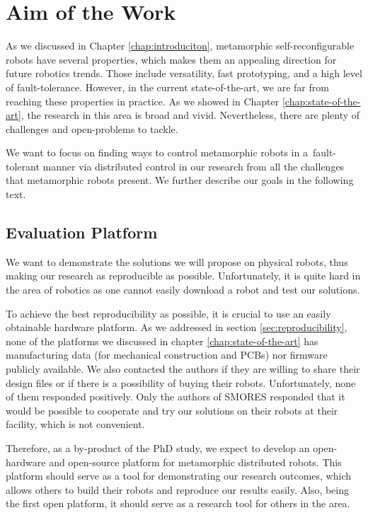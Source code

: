 \chapter{Aim of the Work}

As we discussed in Chapter \ref{chap:introduciton}, metamorphic
self-reconfigurable robots have several properties, which makes them an
appealing direction for future robotics trends. Those include versatility, fast
prototyping, and a high level of fault-tolerance. However, in the current
state-of-the-art, we are far from reaching these properties in practice. As we
showed in Chapter \ref{chap:state-of-the-art}, the research in this area is
broad and vivid. Nevertheless, there are plenty of challenges and open-problems
to tackle.

We want to focus on finding ways to control metamorphic robots in
a~fault-tolerant manner via distributed control in our research from all the
challenges that metamorphic robots present. We further describe our goals in the
following text.

\section{Evaluation Platform}

We want to demonstrate the solutions we will propose on physical robots, thus
making our research as reproducible as possible. Unfortunately, it is quite hard
in the area of robotics as one cannot easily download a robot and test our
solutions.

To achieve the best reproducibility as possible, it is crucial to use an easily
obtainable hardware platform. As we addressed in section
\ref{sec:reproducibility}, none of the platforms we discussed in chapter
\ref{chap:state-of-the-art} has manufacturing data (for mechanical construction
and PCBs) nor firmware publicly available. We also contacted the authors if they
are willing to share their design files or if there is a possibility of buying
their robots. Unfortunately, none of them responded positively. Only the authors
of SMORES \cite{DBLP:conf/iros/DaveyKY12} responded that it would be possible to
cooperate and try our solutions on their robots at their facility, which is not
convenient.

Therefore, as a by-product of the PhD study, we expect to develop an
open-hardware and open-source platform for metamorphic distributed robots. This
platform should serve as a tool for demonstrating our research outcomes, which
allows others to build their robots and reproduce our results easily. Also,
being the first open platform, it should serve as a research tool for others in
the area.

